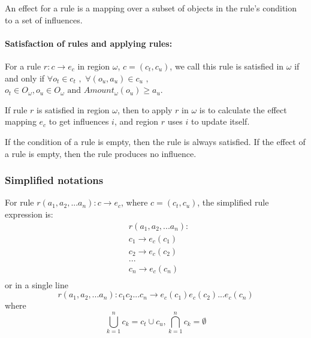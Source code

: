 \documentclass[9pt,a4paper,twoside]{article}
\begin{document}
            An effect for a rule is a mapping over a subset of objects in the rule's condition to a set of influences.
                
                
\paragraph{Satisfaction of rules and applying rules:}  
           
                For a rule $r: c \rightarrow e_c$ in region $\omega$, $c = (c_t, c_u)$, we call this rule is satisfied in $\omega$ if and only if 
                $\forall o_t \in c_t$ $,$ $ \forall (o_u, a_u) \in c_u$ $,$ $o_t \in O_{\omega}, o_u \in O_{\omega} \text{ and } Amount_\omega(o_u) \geq a_u$.
                
                If rule $r$ is satisfied in region $\omega$, then to apply $r$ in $\omega$ is to calculate the effect mapping $e_c$ to get influences $i$,
                and region $r$ uses $i$ to update itself.
                
                If the condition of a rule is empty, then the rule is always satisfied. If the effect of a rule is empty, then the rule produces no influence.

\subsubsection{Simplified notations}
        
            For rule $r(a_1,a_2,...a_n): c \rightarrow e_c$, where $c=(c_t, c_u)$, the simplified rule expression is:
            \begin{equation}
                \begin{align}
                    &r(a_1,a_2,...a_n): \\
                    &c_1 \rightarrow e_c(c_1)  \\
                    &c_2 \rightarrow e_c(c_2)  \\
                    &...\\
                    &c_n \rightarrow e_c(c_n)  \\
                \end{align}
            \end{equation}
            or in a single line
            \begin{equation}
                r(a_1,a_2,...a_n): c_1c_2...c_n \rightarrow e_c(c_1)e_c(c_2)...e_c(c_n)
            \end{equation}
            where
            \begin{equation}
                \bigcup_{k = 1}^{n}{c_k} = c_t \cup c_u, \bigcap_{k = 1}^{n}{c_k} = \emptyset
            \end{equation}
            
\end{document}
